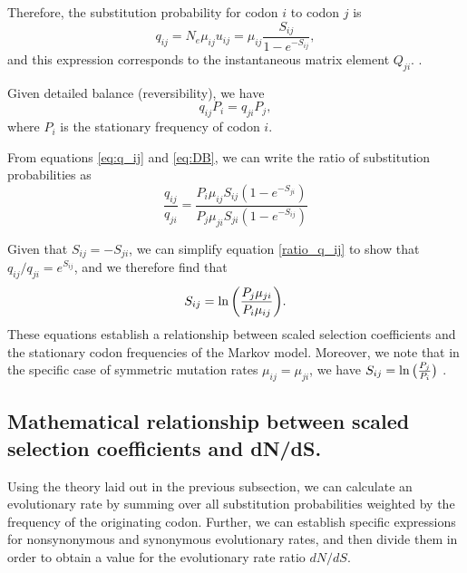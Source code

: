 \documentclass{pnastwo}
\begin{document}
\begin{article}
Therefore, the substitution probability for codon $i$ to codon $j$ is 
\begin{equation}\label{eq:q_ij}
q_{ij} = N_e\mu_{ij}u_{ij} = \mu_{ij}\frac{S_{ij}}{1 - e^{-S_{ij}}} , 
\end{equation} and this expression corresponds to the instantaneous matrix element $Q_{ji}$. 
\cite{HalpernBruno1998,SellaHirsh2005}. 

Given detailed balance (reversibility), we have 
\begin{equation}\label{eq:DB}
q_{ij}P_i = q_{ji}P_j,
\end{equation} 
where $P_i$ is the stationary frequency of codon $i$. 

From equations \eqref{eq:q_ij} and \eqref{eq:DB}, we can write the ratio of substitution probabilities as 
\begin{equation}\label{ratio_q_ij}
\frac{q_{ij}}{q_{ji}} = \frac{P_i \mu_{ij} S_{ij} (1-e^{-S_{ji}})}{P_j \mu_{ji} S_{ji} (1-e^{-S_{ij}})} 
\end{equation}


Given that $S_{ij} = -S_{ji}$, we can simplify equation \eqref{ratio_q_ij} to show that $q_{ij}/q_{ji} = e^{S_{ij}}$, and we therefore find that
\begin{equation}\label{eq:s_pmu}
S_{ij} = \ln\bigg{(} \frac{P_j\mu_{ji}}{P_i\mu_{ij}} \bigg{)}. 
\end{equation}
These equations establish a relationship between scaled selection coefficients and the stationary codon frequencies of the Markov model. Moreover, we note that in the specific case of symmetric mutation rates $\mu_{ij} = \mu_{ji}$, we have $S_{ij} = \ln\big{(}{\frac{P_j} {P_i}}\big{)}$ \cite{SellaHirsh2005}. 


		
\subsection*{Mathematical relationship between scaled selection coefficients and dN/dS.} 

Using the theory laid out in the previous subsection, we can calculate an evolutionary rate by summing over all substitution probabilities weighted by the frequency of the originating codon. Further, we can establish specific expressions for nonsynonymous and synonymous evolutionary rates, and then divide them in order to obtain a value for the evolutionary rate ratio $dN/dS$.


\end{article}
\end{document}
